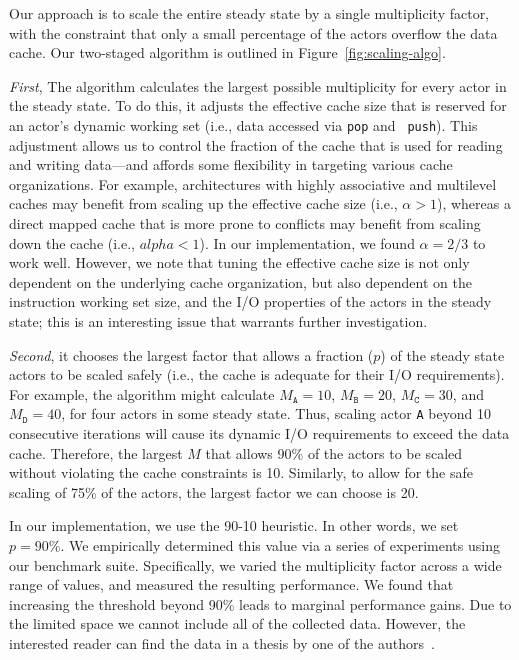 Our approach is to scale the entire steady state by a single
multiplicity factor, with the constraint that only a small percentage
of the actors overflow the data cache. Our two-staged algorithm is
outlined in Figure~\ref{fig:scaling-algo}.

{\it First}, The algorithm calculates the largest
possible multiplicity  
for every actor in the steady state. To do this, it
adjusts the effective cache size that is reserved for an actor's
dynamic working set (i.e., data accessed via {\tt pop} and {\tt
push}). This adjustment allows us to control the fraction of the cache
that is used for reading and writing data---and affords some
flexibility in targeting various cache organizations.  For example,
architectures with highly associative and multilevel caches may benefit
from scaling up the effective cache size (i.e., $\alpha > 1$), whereas
a direct mapped cache that is more prone to conflicts may benefit from
scaling down the cache (i.e., $alpha < 1$). In our implementation, we
found $\alpha=2/3$ to work well. However, we note that tuning the
effective cache size is not only dependent on the underlying cache
organization, but also dependent on the instruction  working
set size, and the  I/O properties of the actors in the steady
state; this is an interesting issue that warrants further
investigation.

{\it Second}, it chooses the largest
factor that allows a fraction ($p$) of the steady state actors to be
scaled safely (i.e., the cache is adequate for their I/O
requirements).  For example, the algorithm might calculate
$M_\texttt{A} = 10$,
$M_\texttt{B} = 20$, 
$M_\texttt{C} = 30$, and 
$M_\texttt{D} = 40$, for four actors in some steady state. Thus,
scaling actor \texttt{A} beyond 10 consecutive iterations will cause
its dynamic I/O requirements to exceed the data cache. Therefore, the
largest $M$ that allows 90\% of the actors to be
scaled without violating the cache constraints is 10.
Similarly, to allow for the safe scaling of 75\% of the actors, the
largest factor we can choose is 20.

In our implementation, we use the 90-10 heuristic. In other words, we
set $p=90\%$. We empirically determined this value via a series of
experiments using our benchmark suite. Specifically, we varied the
multiplicity factor across a wide range of values,
and measured the resulting performance. We found that
increasing the threshold beyond 90\% leads to marginal
performance gains. Due to the limited space we cannot include all of
the collected data. However, the interested reader can find
the data in a thesis by one of the authors~\cite{janis-thesis}.
